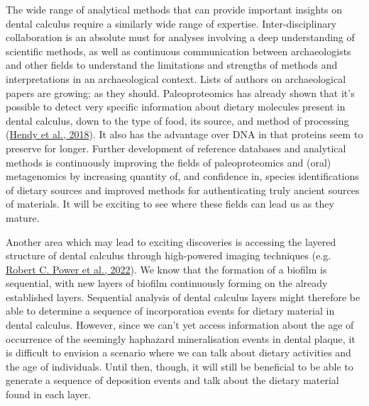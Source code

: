 \documentclass[
  b5paper,
]{book}
\begin{document}
The wide range of analytical methods that can provide important insights
on dental calculus require a similarly wide range of expertise.
Inter-disciplinary collaboration is an absolute must for analyses
involving a deep understanding of scientific methods, as well as
continuous communication between archaeologists and other fields to
understand the limitations and strengths of methods and interpretations
in an archaeological context. Lists of authors on archaeological papers
are growing; as they should. Paleoproteomics has already shown that it's
possible to detect very specific information about dietary molecules
present in dental calculus, down to the type of food, its source, and
method of processing
(\protect\hyperlink{ref-hendyProteomicCalculus2018}{Hendy et al.,
2018}). It also has the advantage over DNA in that proteins seem to
preserve for longer. Further development of reference databases and
analytical methods is continuously improving the fields of
paleoproteomics and (oral) metagenomics by increasing quantity of, and
confidence in, species identifications of dietary sources and improved
methods for authenticating truly ancient sources of materials. It will
be exciting to see where these fields can lead us as they mature.

Another area which may lead to exciting discoveries is accessing the
layered structure of dental calculus through high-powered imaging
techniques (e.g.
\protect\hyperlink{ref-powerSynchrotronRadiationbased2022}{Robert C.
Power et al., 2022}). We know that the formation of a biofilm is
sequential, with new layers of biofilm continuously forming on the
already established layers. Sequential analysis of dental calculus
layers might therefore be able to determine a sequence of incorporation
events for dietary material in dental calculus. However, since we can't
yet access information about the age of occurrence of the seemingly
haphazard mineralisation events in dental plaque, it is difficult to
envision a scenario where we can talk about dietary activities and the
age of individuals. Until then, though, it will still be beneficial to
be able to generate a sequence of deposition events and talk about the
dietary material found in each layer.
\end{document}
